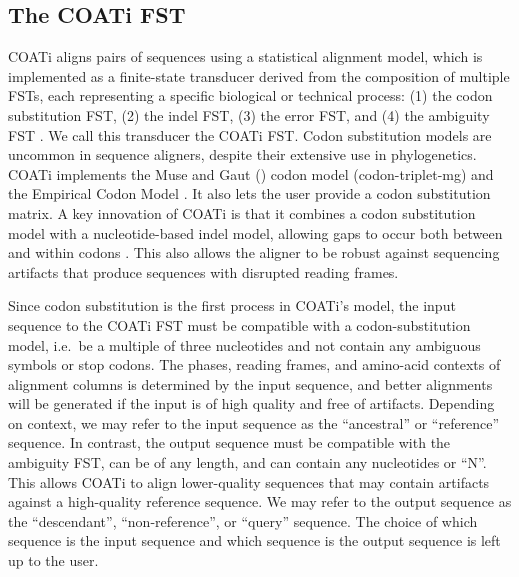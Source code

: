 \documentclass[12pt,letterpaper]{article}
\begin{document}
\subsection*{The COATi FST}

COATi aligns pairs of sequences using a statistical alignment model, which is implemented as a finite-state transducer derived from the composition of multiple FSTs, each representing a specific biological or technical process: (1) the codon substitution FST, (2) the indel FST, (3) the error FST, and (4) the ambiguity FST \citep[Figs.~\ref{fig:base-calling}--\ref{fig:coati-fst}; c.f.][]{holmes2001evolutionary}. We call this transducer the COATi FST. Codon substitution models are uncommon in sequence aligners, despite their extensive use in phylogenetics. COATi implements the Muse and Gaut (\citeyear{muse_gaut_1994}) codon model (codon-triplet-mg) and the Empirical Codon Model \citep[codon-triplet-ecm;][]{kosiol_ECM_2007}.
It also lets the user provide a codon substitution matrix. A key innovation of COATi is that it combines a codon substitution model with a nucleotide-based indel model, allowing gaps to occur both between and within codons \citep[c.f.][]{ranwez_macse_2011,ranwez_macse_2018}. This also allows the aligner to be robust against sequencing artifacts that produce sequences with disrupted reading frames.

Since codon substitution is the first process in COATi's model, the input sequence to the COATi FST must be compatible with a codon-substitution model, i.e.\ be a multiple of three nucleotides and not contain any ambiguous symbols or stop codons. The phases, reading frames, and amino-acid contexts of alignment columns is determined by the input sequence, and better alignments will be generated if the input is of high quality and free of artifacts. Depending on context, we may refer to the input sequence as the ``ancestral'' or ``reference'' sequence. In contrast, the output sequence must be compatible with the ambiguity FST, can be of any length, and can contain any nucleotides or ``N''. This allows COATi to align lower-quality sequences that may contain artifacts against a high-quality reference sequence. We may refer to the output sequence as the ``descendant'', ``non-reference'', or ``query'' sequence. The choice of which sequence is the input sequence and which sequence is the output sequence is left up to the user.
\end{document}
